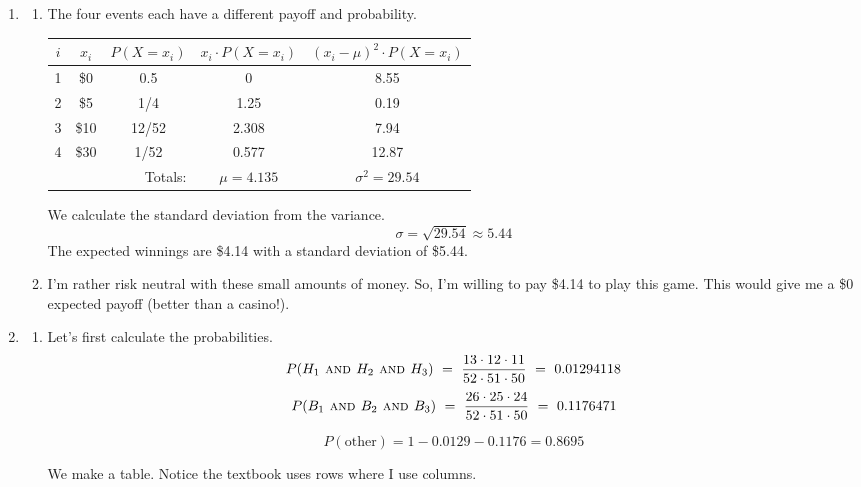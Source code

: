 \documentclass[12pt,letterpaper]{article}
\begin{document}
\begin{enumerate}
\item \begin{enumerate}
\item The four events each have a different payoff and probability.
\begin{center}
\renewcommand{\arraystretch}{1.3}
\begin{tabular}{|c|c|c|c|c|} \hline
$i$ & $x_i$ & $P(X=x_i)$ & $x_i \cdot P(X=x_i)$ & $(x_i-\mu)^2 \cdot P(X=x_i)$\\ \hline
1 & \$0 & 0.5 & 0 & 8.55 \\
2 & \$5 & 1/4 & 1.25 & 0.19 \\
3 & \$10 & 12/52 & 2.308 & 7.94\\
4 & \$30 & 1/52 & 0.577 & 12.87\\ \hline
\multicolumn{3}{r|}{Totals:} & $\mu=4.135$ & $\sigma^2=29.54$ \\\cline{4-5}
\end{tabular}
\end{center}
We calculate the standard deviation from the variance.
$$\sigma = \sqrt{29.54} \approx 5.44 $$
The expected winnings are \$4.14 with a standard deviation of \$5.44.
\item I'm rather risk neutral with these small amounts of money. So, I'm willing to pay \$4.14 to play this game. This would give me a \$0 expected payoff (better than a casino!).
\end{enumerate}

\item \begin{enumerate}
\item Let's first calculate the probabilities.
$$P(H_1 \textsc{~and~} H_2 \textsc{~and~} H_3) ~=~ \frac{13\cdot 12 \cdot 11}{52 \cdot 51 \cdot 50} ~=~ 0.01294118 $$
$$P(B_1 \textsc{~and~} B_2 \textsc{~and~} B_3) ~=~ \frac{26\cdot 25 \cdot 24}{52 \cdot 51 \cdot 50} ~=~ 0.1176471 $$

$$P(\text{other}) = 1-0.0129-0.1176 = 0.8695$$

We make a table. Notice the textbook uses rows where I use columns.


\end{enumerate}
\end{enumerate}
\end{document}

